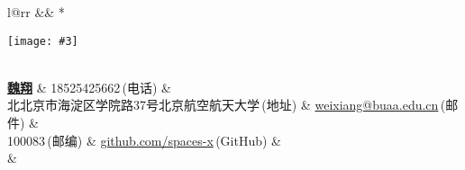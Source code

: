 \newcommand{\paint}[3]{
    \begin{minipage}{#1}
        \texttt{[image: \#3]}
    \end{minipage} 
}
\newcommand{\myheader}{
\begin{tabular*}{\textwidth}{l@{\extracolsep{\fill}}rr}
  && \multirow{4}*{\paint{2.6cm}{3.4cm}{./image.jpg}}\\
  \specialrule{0em}{6pt}{6pt}
  \textbf{\href{http://spaces-x.github.io}{\LARGE 魏翔}} & 18525425662$\,${\color{labelgrey}(电话)} &\\
  北北京市海淀区学院路37号北京航空航天大学$\,${\color{labelgrey}(地址)} & \href{mailto:weixiang@buaa.edu.cn}{weixiang@buaa.edu.cn}$\,${\color{labelgrey}(邮件)} & \\
  100083$\,${\color{labelgrey}(邮编)} & \href{https://github.com/spaces-x}{github.com/spaces-x}$\,${\color{labelgrey}(GitHub)} & \\
  & \\
  
  \end{tabular*}\\\vspace{0.1in}
}

\myheader


